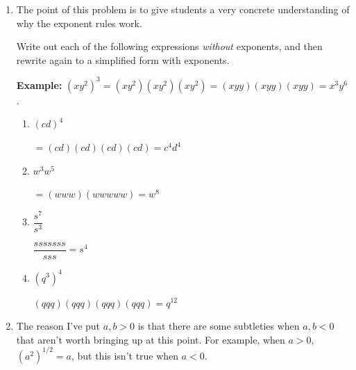 \documentclass{article}
\begin{document}
\begin{enumerate}
\item 
  \label{exponents-write-out-then-simplify}

  \begin{workshop}
    The point of this problem is to give students a very concrete
    understanding of why the exponent rules work.
  \end{workshop}

  Write out each of the following expressions \emph{without} exponents, 
  and then rewrite again to a simplified form with exponents.

  \textbf{Example:}
  $(x y^2)^3 = (xy^2)(xy^2)(xy^2) = (xyy)(xyy)(xyy) = x^3 y^6$.

  \begin{enumerate}
  \item
    \begin{problem}
      $(cd)^4$
    \end{problem}
    \begin{solution}
        $=(cd)(cd)(cd)(cd)=c^4d^4$
    \end{solution}

  \item
    \begin{problem}
      $w^3 w^5$
    \end{problem}
    \begin{solution}
        $=(www)(wwwww)=w^8$
    \end{solution}

  \item
    \begin{problem}
      $\dfrac{s^7}{s^3}$
    \end{problem}
    \begin{solution}
        $\dfrac{sssssss}{sss}=s^4$
    \end{solution}
  \item
    \begin{problem}
      $(q^3)^4$
    \end{problem}
    \begin{solution}
        $(qqq)(qqq)(qqq)(qqq)=q^{12}$
    \end{solution}

  \end{enumerate}

\item  \label{basic-exponent-rules}

  \begin{workshop}
    The reason I've put $a, b > 0$ is that there are some subtleties when $a, b < 0$ that aren't worth bringing up at this point. For example, when $a > 0$, $\left( a^2 \right)^{1/2} = a$, but this isn't true when $a < 0$.


\end{workshop}
\end{enumerate}
\end{document}
